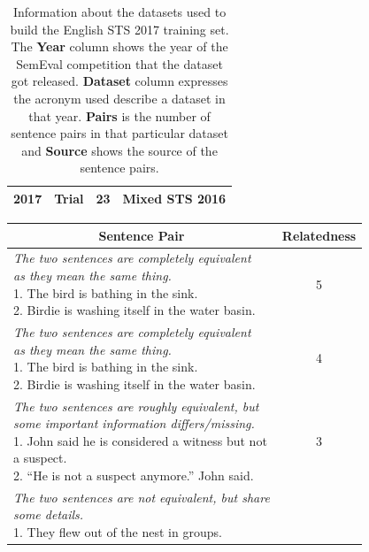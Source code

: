 \begin{enumerate}
\begin{table}[ht!]
\begin{tabular}{c|c|c|l}
 		\hline
 		2017 \cite{cer-etal-2017-semeval} & Trial & 23 & Mixed STS 2016 \\
 		\hline
 	\end{tabular}
 	\caption[Information about English STS 2017 training set]{Information about the datasets used to build the English STS 2017 training set. The \textbf{Year} column shows the year of the SemEval competition that the dataset got released. \textbf{Dataset} column expresses the acronym used describe a dataset in that year. \textbf{Pairs} is the number of sentence pairs in that particular dataset and \textbf{Source} shows the source of the sentence pairs. }
 	\label{tab:englishdata_info}
 \end{table}

 
   \begin{table}[ht!]
 	\centering 	
 	\begin{tabular}{l|c} 
 		\hline
 		\multicolumn{1}{c|}{\textbf{Sentence Pair}} & 
 		\multicolumn{1}{c}{\textbf{Relatedness}}  \\
 		\hline
 		\makecell[l]
 		{\textit{The two sentences are completely equivalent}  \\ \textit{as they mean the same thing.} \\
 			1. The bird is bathing in the sink. \\ 
 			2. Birdie is washing itself in the water basin.} & 5  \\
 		\hline
 		\makecell[l]
 		{\textit{The two sentences are completely equivalent}  \\ \textit{as they mean the same thing.} \\
 			1. The bird is bathing in the sink. \\ 
 			2. Birdie is washing itself in the water basin.} & 4  \\
 		\hline
 		\makecell[l]
 		{\textit{The two sentences are roughly equivalent, but }  \\ \textit{some important information differs/missing.} \\
 			1. John said he is considered a witness but not \\ a suspect. \\ 
 			2. “He is not a suspect anymore.” John said.} & 3  \\
 		\hline
 		\makecell[l]
 		{\textit{The two sentences are not equivalent, but share } \\
 			\textit{some details.} \\
 			1. They flew out of the nest in groups. \\ 
}
\end{tabular}
\end{table}
\end{enumerate}
